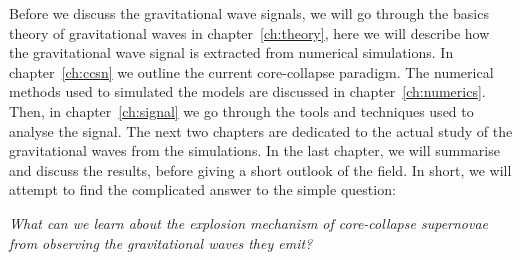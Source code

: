 Before we discuss the gravitational wave signals, we will go through the basics theory of gravitational waves in
chapter~\ref{ch:theory}, here we will describe how the gravitational wave signal is extracted from numerical simulations. 
In chapter~\ref{ch:ccsn} we outline the current core-collapse paradigm. The numerical
methods used to simulated the models are discussed in chapter~\ref{ch:numerics}. Then, in chapter~\ref{ch:signal}
we go through the tools and techniques used to analyse the signal. The next two chapters are dedicated to
the actual study of the gravitational waves from the simulations. In the last chapter, we will summarise and discuss
the results, before giving a short outlook of the field.
\newpage
\vspace*{\fill}
\begingroup
\centering
In short, we will attempt to find the 
complicated answer to the simple question:
\begin{displayquote}
\textit{What can we learn about the explosion mechanism of core-collapse supernovae
from observing the gravitational waves they emit?}
\end{displayquote}
\endgroup
\vspace*{\fill}
